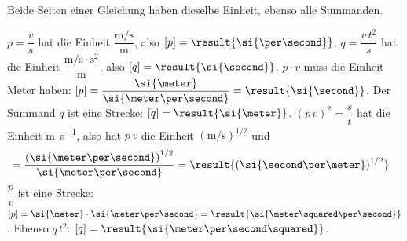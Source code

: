 Beide Seiten einer Gleichung haben dieselbe Einheit, ebenso alle Summanden.
\begin{abcliste}
\abc $p = \dfrac{v}{s}$ hat die Einheit $\dfrac{\si{\meter\per\second}}{\si{\meter}}$, also $[p] = \result{\si{\per\second}}$.
\abc $q = \dfrac{v\,t^2}{s}$ hat die Einheit $\dfrac{\si{\meter\per\second}\cdot\si{\second\squared}}{\si{\meter}}$, also $[q] = \result{\si{\second}}$.
\abc $p\cdot v$ muss die Einheit Meter haben: $[p] = \dfrac{\si{\meter}}{\si{\meter\per\second}} = \result{\si{\second}}$. Der Summand $q$ ist eine Strecke: $[q] = \result{\si{\meter}}$.
\abc $\left(p\,v\right)^2 = \dfrac{s}{t}$ hat die Einheit \si{\meter\per\second}, also hat $p\,v$ die Einheit $\left(\si{\meter\per\second}\right)^{1/2}$ und
\begin{align}
 [p] &= \frac{\left(\si{\meter\per\second}\right)^{1/2}}{\si{\meter\per\second}} = \result{\left(\si{\second\per\meter}\right)^{1/2}}
\end{align}
\abc $\dfrac{p}{v}$ ist eine Strecke: $[p] = \si{\meter}\cdot\si{\meter\per\second} = \result{\si{\meter\squared\per\second}}$. Ebenso $q\,t^2$: $[q] = \result{\si{\meter\per\second\squared}}$.
\end{abcliste}

